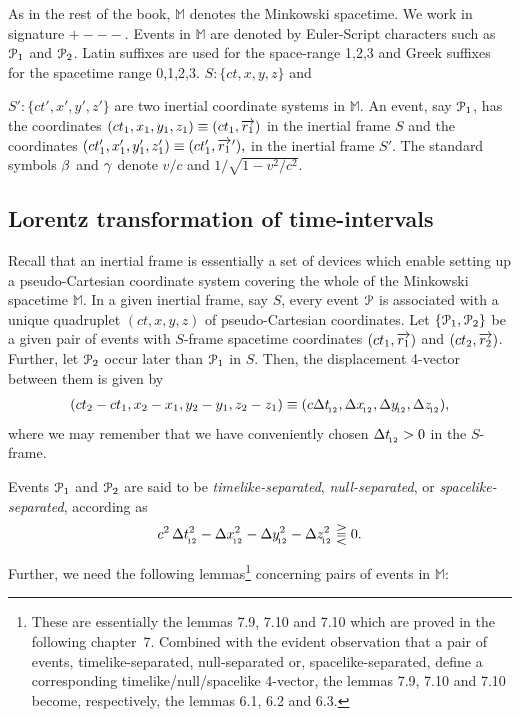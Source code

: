 As in the rest of the book, $\mathbb{M}$ denotes the 
Minkowski  spacetime. We work in signature $ +--- $. 
Events 
in $ \mathbb{M}$ are denoted by Euler-Script 
characters 
such 
as $ \EuScript{P}_1$ and $\EuScript{P}_2$. Latin 
suffixes 
are used for the space-range 1,2,3 and Greek suffixes 
for 
the spacetime range 0,1,2,3. $ S : \{ct, x, y, z\}$ and 
 
$S' 
: \{ct', x', y', z' \}$ are two inertial coordinate 
systems 
in $\mathbb{M}$. An event, say $\EuScript{P}_1$, has 
the 
coordinates $(ct_1,x_1,y_1,z_1)  \equiv 
(ct_1,\overrightarrow{r_1})$ 
in 
the inertial frame $S$ and the coordinates  
$(ct'_1,x'_1,y'_1,z'_1)\equiv (ct'_1,{\overrightarrow{r_1}\hspace*{.3pt}'}),$ in 
the 
inertial frame $S'$. The standard symbols ${\beta}$ and 
${\gamma}$ 
denote $v / c$ and  $1/ \sqrt{1 -v^2 / c^2}$.

\subsection{Lorentz transformation of  time-intervals}
Recall that an inertial frame is essentially a set of 
devices which enable setting up a pseudo-Cartesian 
coordinate system covering the whole of the Minkowski 
spacetime $\mathbb{M}$. In a given inertial frame, say 
$S$, 
every event  $\EuScript{P}$ is associated with a 
unique 
quadruplet $(ct,x,y,z)$ of pseudo-Cartesian 
coordinates. 
Let $\{\EuScript{P}_1, \EuScript{P}_2\}$ be a given 
pair of 
events with $S$-frame spacetime coordinates 
$(ct_1,\overrightarrow{r_1})$ and $(ct_2,\overrightarrow{r_2})$. Further, 
let 
$\EuScript{P}_2$ occur later than $\EuScript{P}_1$ in 
$S$. 
Then, the displacement 4-vector between them is given 
by  
\begin{align*}
 (ct_2-ct_1, x_2-x_1,y_2-y_1,z_2-z_1) \equiv 
(c\Delta 
t_{_{\hspace*{-1.5pt}{12}}},\Delta x_{_{\hspace*{-1.5pt}{12}}}, \Delta y_{_{\hspace*{-1.5pt}{12}}}, 
\Delta 
z_{_{\hspace*{-1.5pt}{12}}}),
\end{align*}
where we may remember that we have 
conveniently  chosen $\Delta t_{_{\hspace*{-1.5pt}{12}}} > 0$ in the 
$S$-frame.

Events $\EuScript{P}_1$ and $\EuScript{P}_2$ are said 
to be 
\textsl{timelike-separated}, \textsl{null-separa\break ted}, 
or 
\textsl{spacelike-separated}, according as
\begin{align*}
c^2\,\Delta t_{_{\hspace*{-1.5pt}{12}}}^2-\Delta
x_{_{\hspace*{-1.5pt}{12}}}^2-\Delta y_{_{\hspace*{-1.5pt}{12}}}^2-\Delta
z_{_{\hspace*{-1.5pt}{12}}}^2 \gtreqqless 0.
\end{align*}

Further, we need the following lemmas\footnote{These 
are 
essentially the lemmas 7.9, 7.10 and 7.10 which are 
proved 
in the following chapter~7. Combined with the evident 
observation that a pair of events, timelike-separated, 
null-separated or, spacelike-separated, define a 
corresponding timelike/null/spacelike 4-vector, the 
lemmas 
7.9, 7.10 and 7.10 become, respectively, the lemmas 
6.1, 
6.2 
and 6.3.} concerning pairs of events in $\mathbb{M}$:

